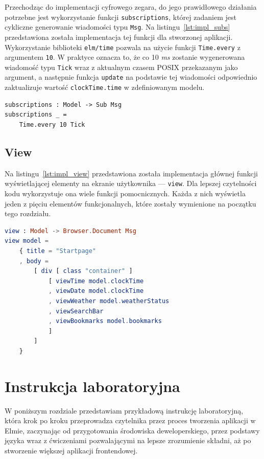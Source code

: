 \documentclass[twoside,a4paper]{report}
\begin{document}
Przechodząc do implementacji cyfrowego zegara, do jego prawidłowego działania potrzebne jest wykorzystanie funkcji \texttt{subscriptions}, której zadaniem jest cykliczne generowanie wiadomości typu \texttt{Msg}. Na listingu~\ref{lst:impl_subs} przedstawiona została implementacja tej funkcji dla stworzonej aplikacji. Wykorzystanie biblioteki \texttt{elm/time} pozwala na użycie funkcji \texttt{Time.every} z argumentem \texttt{10}. W praktyce oznacza to, że co 10 \textit{ms} zostanie wygenerowana wiadomość typu \texttt{Tick} wraz z aktualnym czasem POSIX przekazanym jako argument, a następnie funkcja \texttt{update} na podstawie tej wiadomości odpowiednio zaktualizuje wartość \texttt{clockTime.time} w zdefiniowanym modelu.

\begin{lstlisting}[mathescape,caption={Implementacja funkcji \texttt{subscriptions}},label={lst:impl_subs}]
subscriptions : Model -> Sub Msg
subscriptions _ =
    Time.every 10 Tick
\end{lstlisting}

\section{View}
Na listingu~\ref{lst:impl_view} przedstawiona została implementacja głównej funkcji wyświetlającej elementy na ekranie użytkownika --- \texttt{view}.
Dla lepszej czytelności kodu wykorzystuje ona wiele funkcji pomocnicznych.
Każda z nich wyświetla jeden z pięciu elementów funkcjonalnych, które zostały wymienione na początku tego rozdziału.
\begin{lstlisting}[mathescape,caption={Implementacja funkcji \texttt{view}},label={lst:impl_view},language={Elm}]
view : Model -> Browser.Document Msg
view model =
    { title = "Startpage"
    , body =
        [ div [ class "container" ]
            [ viewTime model.clockTime
            , viewDate model.clockTime
            , viewWeather model.weatherStatus
            , viewSearchBar
            , viewBookmarks model.bookmarks
            ]
        ]
    }
\end{lstlisting}


\chapter{Instrukcja laboratoryjna}
W poniższym rozdziale przedstawiam przykładową instrukcję laboratoryjną, która krok po kroku przeprowadza czytelnika przez proces tworzenia aplikacji w Elmie, zaczynając od przygotowania środowiska deweloperskiego, przez podstawy języka wraz z ćwiczeniami pozwalającymi na lepsze zrozumienie składni, aż po stworzenie większej aplikacji frontendowej.
\end{document}
